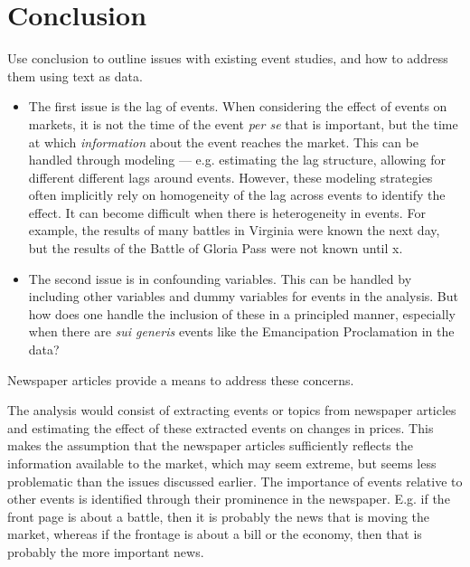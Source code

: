 \section{Conclusion}
\label{bonds_battles:sec:conclusion}

Use conclusion to outline issues with existing event studies, and how to address them using text as data.

\begin{itemize}
\item The first issue is the lag of events.
  When considering the effect of events on markets, it is not the time of the event \textit{per se} that is important, but the time at which \textit{information} about the event reaches the market.
  This can be handled through modeling --- e.g. estimating the lag structure, allowing for different different lags around events.
  However, these modeling strategies often implicitly rely on homogeneity of the lag across events to identify the effect.
  It can become difficult when there is heterogeneity in events. For example, the results of many battles in Virginia were known the next day, but the results of the Battle of Gloria Pass were not known until x.

\item The second issue is in confounding variables.
  This can be handled by including other variables and dummy variables for events in the analysis.
  But how does one handle the inclusion of these in a principled manner, especially when there are \textit{sui generis} events like the Emancipation Proclamation in the data?
\end{itemize}

Newspaper articles provide a means to address these concerns.

The analysis would consist of extracting events or topics from newspaper articles and estimating the effect of these extracted events on changes in prices.
This makes the assumption that the newspaper articles sufficiently reflects the information available to the market, which may seem extreme, but seems less problematic than the issues discussed earlier.
The importance of events relative to other events is identified through their prominence in the newspaper. E.g. if the front page is about a battle, then it is probably the news that is moving the market, whereas if the frontage is about a bill or the economy, then that is probably the more important news.

